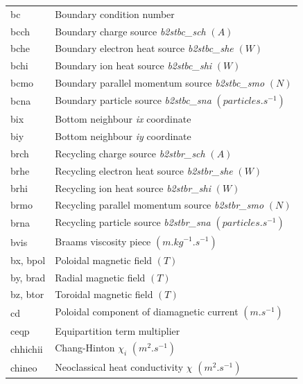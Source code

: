 \documentclass[a4paper,10pt]{report}
\begin{document}
\begin{center}
\begin{longtable}{|l|l|}
    bc       & \index{b2plot, bc} Boundary condition number \\
    bcch     & \index{b2plot, bcch} Boundary charge source {\em b2stbc\_sch} $(A)$ \\
    bche     & \index{b2plot, bche} Boundary electron heat source {\em b2stbc\_she} $(W)$ \\
    bchi     & \index{b2plot, bchi} Boundary ion heat source {\em b2stbc\_shi} $(W)$ \\
    bcmo     & \index{b2plot, bcmo} Boundary parallel momentum source {\em b2stbc\_smo} $(N)$ \\
    bcna     & \index{b2plot, bcna} Boundary particle source {\em b2stbc\_sna} $(particles.s^{-1})$ \\
    bix      & \index{b2plot, bix} Bottom neighbour {\em ix} coordinate \\
    biy      & \index{b2plot, biy} Bottom neighbour {\em iy} coordinate  \\
    brch     & \index{b2plot, brch} Recycling charge source {\em b2stbr\_sch} $(A)$ \\
    brhe     & \index{b2plot, brhe} Recycling electron heat source {\em b2stbr\_she} $(W)$ \\
    brhi     & \index{b2plot, brhi} Recycling ion heat source {\em b2stbr\_shi} $(W)$ \\
    brmo     & \index{b2plot, brmo} Recycling parallel momentum source {\em b2stbr\_smo} $(N)$ \\
    brna     & \index{b2plot, brna} Recycling particle source {\em b2stbr\_sna} $(particles.s^{-1})$ \\
    bvis     & \index{b2plot, bvis} Braams viscosity piece $(m.kg^{-1}.s^{-1})$ \\
    bx, bpol       & \index{b2plot, bx} Poloidal magnetic field $(T)$ \index{b2plot, bpol} \\
    by, brad       & \index{b2plot, by} Radial magnetic field $(T)$ \index{b2plot, brad} \\
    bz, btor       & \index{b2plot, bz} Toroidal magnetic field $(T)$ \index{b2plot, btor} \\
    cd       & \index{b2plot, cd} Poloidal component of diamagnetic current $(m.s^{-1})$ \\
    ceqp     & \index{b2plot, ceqp} Equipartition term multiplier \\
    chhichii & \index{b2plot, chhichii} Chang-Hinton $\chi_i$ $(m^2.s^{-1})$ \\
    chineo   & \index{b2plot, chineo} Neoclassical heat conductivity $\chi$ $(m^2.s^{-1})$ \\

\end{longtable}
\end{center}
\end{document}
